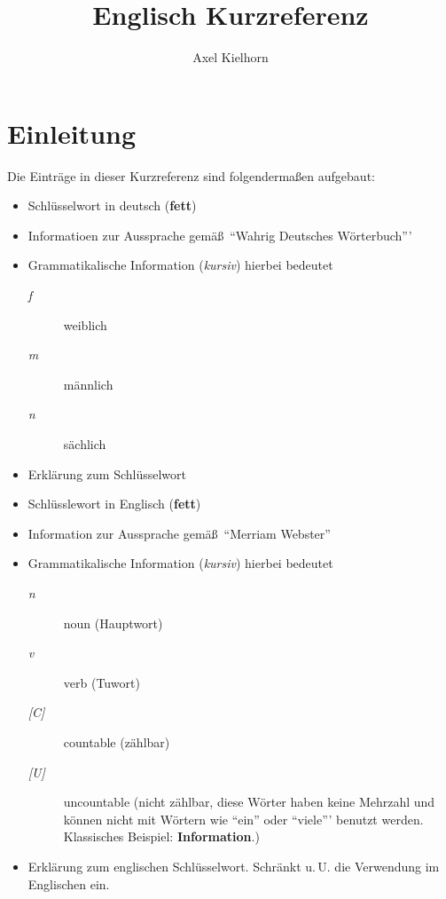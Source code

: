 \documentclass[a5paper,10pt,titlepage]{article}
\title{Englisch Kurzreferenz}
\author{Axel Kielhorn}
\begin{document}
\maketitle

\section*{Einleitung}

Die Eintr\"{a}ge in dieser Kurzreferenz sind folgenderma\ss en aufgebaut:
\begin{itemize}
\item Schl\"{u}sselwort in deutsch (\textbf{fett})
\item Informatioen zur Aussprache gem\"{a}\ss\ "`Wahrig Deutsches W\"{o}rterbuch"''
\item Grammatikalische Information (\textit{kursiv}) hierbei bedeutet
  \begin{description}
  \item [\textit{f}] weiblich
  \item [\textit{m}] m\"{a}nnlich
  \item [\textit{n}] s\"{a}chlich
  \end{description}
\item Erkl\"{a}rung zum Schl\"{u}sselwort
\item Schl\"{u}sslewort in Englisch (\textbf{fett})
\item Information zur Aussprache gem\"{a}\ss\ "`Merriam Webster"'
\item Grammatikalische Information (\textit{kursiv}) hierbei bedeutet
  \begin{description}
  \item [\textit{n}] noun (Hauptwort)
  \item [\textit{v}] verb (Tuwort)
  \item [\textit{[C]}] countable (z\"{a}hlbar)
  \item [\textit{[U]}] uncountable (nicht z\"{a}hlbar, diese W\"{o}rter haben keine 
  Mehrzahl und k\"{o}nnen nicht mit W\"{o}rtern wie "`ein"' oder "`viele"'' 
  benutzt werden. Klassisches Beispiel: \textbf{Information}.)
  \end{description}
\item Erkl\"{a}rung zum englischen Schl\"{u}sselwort. Schr\"{a}nkt u.\,U. die 
Verwendung im Englischen ein.
\end{itemize}

\newpage 

\pagestyle{dictheadings} %
\end{document}
